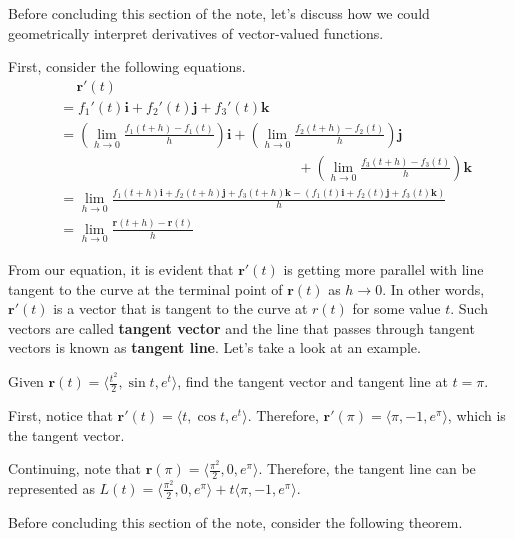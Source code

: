 \documentclass[../../../main.tex]{subfiles}
\begin{document}
Before concluding this section of the note, let's discuss how we
could geometrically interpret derivatives of vector-valued functions.

First, consider the following equations.
\begin{align*}
    &\quad\ \mathbf{r}'(t) \\
    &= f_1'(t) \mathbf{i} + f_2'(t) \mathbf{j} + f_3'(t) \mathbf{k} \\
    &= \left(
        \lim_{h \to 0} \frac{f_1(t + h) - f_1(t)}{h}
    \right) \mathbf{i} + \left(
        \lim_{h \to 0} \frac{f_2(t + h) - f_2(t)}{h}
    \right) \mathbf{j} \\
    &\qquad\qquad\qquad\qquad\qquad\qquad\qquad\qquad\quad+ \left(
        \lim_{h \to 0} \frac{f_3(t + h) - f_3(t)}{h}
    \right) \mathbf{k} \\
    &= \lim_{h \to 0} \frac{f_1(t + h) \mathbf{i} +
        f_2(t + h) \mathbf{j} + f_3(t + h) \mathbf{k} - \left(
            f_1(t) \mathbf{i} + f_2(t) \mathbf{j} + f_3(t) \mathbf{k}
        \right)
    }{h} \\
    &= \lim_{h \to 0} \frac{\mathbf{r}(t + h) - \mathbf{r}(t)}{h}
\end{align*}

From our equation, it is evident that $\mathbf{r}'(t)$ is getting
more parallel with line tangent to the curve at the terminal point
of $\mathbf{r}(t)$ as $h \to 0$. In other words, $\mathbf{r}'(t)$
is a vector that is tangent to the curve at $r(t)$ for some value $t$.
Such vectors are called \textbf{tangent vector} and the line that
passes through tangent vectors is known as \textbf{tangent line}.
Let's take a look at an example.

\begin{problem}{}{}
Given $\mathbf{r}(t) = \langle \frac{t^2}{2}, \sin t, e^t \rangle$,
find the tangent vector and tangent line at $t = \pi$.
\end{problem}
\begin{solution}
First, notice that $\mathbf{r}'(t) = \langle t, \cos t, e^t \rangle$.
Therefore, $\mathbf{r}'(\pi) = \langle \pi, -1, e^\pi \rangle$,
which is the tangent vector.

Continuing, note that $\mathbf{r}(\pi) = \langle \frac{\pi^2}{2}, 0,
e^\pi \rangle$. Therefore, the tangent line can be represented as
$L(t) = \langle \frac{\pi^2}{2}, 0, e^\pi \rangle + t \langle \pi,
-1, e^\pi \rangle$.
\end{solution}

Before concluding this section of the note, consider the following
theorem.
\end{document}
